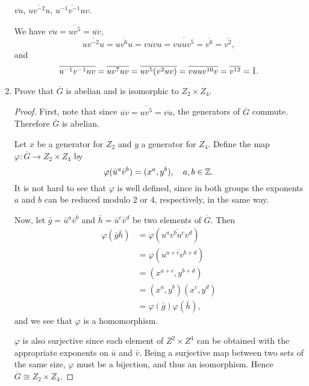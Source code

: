 \begin{enumerate}
  $\overline{vu}$, $\overline{uv^{-2}u}$, $\overline{u^{-1}v^{-1}uv}$.
  \begin{solution}
    We have $\overline{vu} = \overline{uv^5} = \overline{uv}$,
    \begin{equation*}
      \overline{uv^{-2}u}
      = \overline{uv^6u}
      = \overline{vuvu}
      = \overline{vuuv^5}
      = \overline{v^6}
      = \overline{v^2},
    \end{equation*}
    and
    \begin{equation*}
      \overline{u^{-1}v^{-1}uv}
      = \overline{uv^7uv}
      = \overline{uv^5(v^2uv)}
      = \overline{vuuv^{10}v}
      = \overline{v^{12}}
      = \bar1. \qedhere
    \end{equation*}
  \end{solution}
\item Prove that $\overline{G}$ is abelian and is isomorphic to
  $Z_2\times Z_4$.
  \begin{proof}
    First, note that since
    $\overline{uv} = \overline{uv^5} = \overline{vu}$, the generators
    of $\overline{G}$ commute. Therefore $\overline{G}$ is abelian.

    Let $x$ be a generator for $Z_2$ and $y$ a generator for
    $Z_4$. Define the map $\varphi\colon\overline{G}\to Z_2\times Z_4$
    by
    \begin{equation*}
      \varphi(\bar{u}^a\bar{v}^b) = (x^a,y^b),
      \quad a,b\in\mathbb{Z}.
    \end{equation*}
    It is not hard to see that $\varphi$ is well defined, since in
    both groups the exponents $a$ and $b$ can be reduced modulo $2$ or
    $4$, respectively, in the same way.

    Now, let $\bar{g} = \bar{u}^a\bar{v}^b$ and
    $\bar{h} = \bar{u}^c\bar{v}^d$ be two elements of
    $\overline{G}$. Then
    \begin{align*}
      \varphi(\bar{g}\bar{h})
      &= \varphi(\overline{u^av^bu^cv^d}) \\
      &= \varphi(\overline{u^{a+c}v^{b+d}}) \\
      &= (x^{a+c},y^{b+d}) \\
      &= (x^a,y^b)(x^c,y^d) \\
      &= \varphi(\bar{g})\varphi(\bar{h}),
    \end{align*}
    and we see that $\varphi$ is a homomorphism.

    $\varphi$ is also surjective since each element of $Z^2\times Z^4$
    can be obtained with the appropriate exponents on $\bar{u}$ and
    $\bar{v}$. Being a surjective map between two sets of the same
    size, $\varphi$ must be a bijection, and thus an
    isomorphism. Hence $\overline{G}\cong Z_2\times Z_4$.
  \end{proof}
\end{enumerate}

